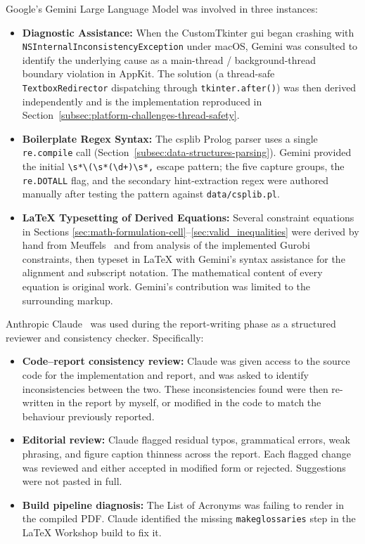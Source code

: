 Google's Gemini Large Language Model \citep{gemini} was involved in three instances:
\begin{itemize}
  \item \textbf{Diagnostic Assistance:} When the CustomTkinter \gls{gui} began crashing with \verb|NSInternalInconsistencyException| under macOS, Gemini was consulted to identify the underlying cause as a main-thread / background-thread boundary violation in AppKit. The solution (a thread-safe \verb|TextboxRedirector| dispatching through \verb|tkinter.after()|) was then derived independently and is the implementation reproduced in Section~\ref{subsec:platform-challenges-thread-safety}.
  \item \textbf{Boilerplate Regex Syntax:} The \gls{csplib} Prolog parser uses a single \verb|re.compile| call (Section~\ref{subsec:data-structures-parsing}). Gemini provided the initial \verb|\s*\(\s*(\d+)\s*,| escape pattern; the five capture groups, the \verb|re.DOTALL| flag, and the secondary hint-extraction regex were authored manually after testing the pattern against \verb|data/csplib.pl|.
  \item \textbf{LaTeX Typesetting of Derived Equations:} Several constraint equations in Sections \ref{sec:math-formulation-cell}--\ref{sec:valid_inequalities} were derived by hand from Meuffels~\citep{meuffels-battleship} and from analysis of the implemented Gurobi constraints, then typeset in LaTeX with Gemini's syntax assistance for the alignment and subscript notation. The mathematical content of every equation is original work. Gemini's contribution was limited to the surrounding markup.
\end{itemize}

Anthropic Claude~\citep{claude} was used during the report-writing phase as a structured reviewer and consistency checker. Specifically:
\begin{itemize}
  \item \textbf{Code--report consistency review:} Claude was given access to the source code for the implementation and report, and was asked to identify inconsistencies between the two. These inconsistencies found were then re-written in the report by myself, or modified in the code to match the behaviour previously reported.
  \item \textbf{Editorial review:} Claude flagged residual typos, grammatical errors, weak phrasing, and figure caption thinness across the report. Each flagged change was reviewed and either accepted in modified form or rejected. Suggestions were not pasted in full.
  \item \textbf{Build pipeline diagnosis:} The List of Acronyms was failing to render in the compiled PDF. Claude identified the missing \verb|makeglossaries| step in the LaTeX Workshop build to fix it.
\end{itemize}

